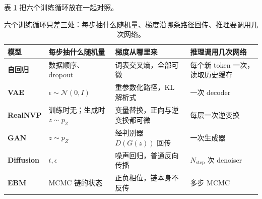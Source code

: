 表 \ref{tab:six-loops} 把六个训练循环放在一起对照。

\begin{table}[H]
\centering\small
\begin{tabularx}{\textwidth}{>{\bfseries}p{26mm} X X X}
\toprule
模型 & 每步抽什么随机量 & 梯度从哪里来 & 推理调用几次网络\\
\midrule
自回归 & 数据顺序、dropout & 词表交叉熵，全部可微 & 每个新 token 一次，读取历史缓存\\
VAE & $\epsilon\sim\mathcal N(0,I)$ & 重参数化路径，KL 解析式 & 一次 decoder\\
RealNVP & 训练时无；生成时 $z\sim p_Z$ & 变量替换，正向与逆变换都可微 & 每层一次逆变换\\
GAN & $z\sim p_Z$ & 经判别器 $D(G(z))$ 回传 & 一次生成器\\
Diffusion & $t,\epsilon$ & 噪声回归，普通反向传播 & $N_{\mathrm{step}}$ 次 denoiser\\
EBM & MCMC 链的状态 & 正负相位，链本身不反传 & 多步 MCMC\\
\bottomrule
\end{tabularx}
\caption{六个训练循环只差三处：每步抽什么随机量、梯度沿哪条路径回传、推理要调用几次网络。}
\label{tab:six-loops}
\end{table}

